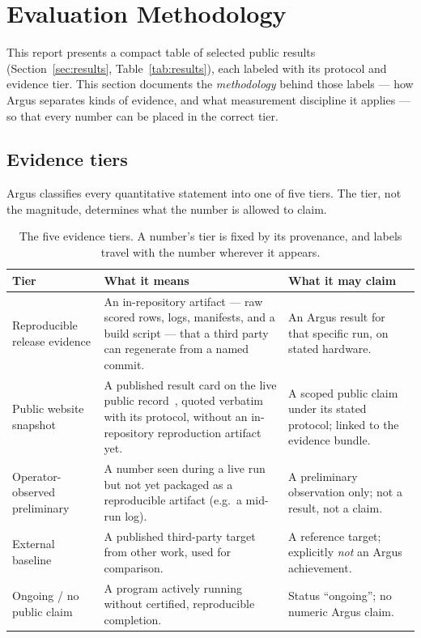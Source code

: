 \section{Evaluation Methodology}
\label{sec:evaluation}

This report presents a compact table of selected public results
(Section~\ref{sec:results}, Table~\ref{tab:results}), each labeled with its
protocol and evidence tier. This section documents the \emph{methodology} behind
those labels --- how Argus separates kinds of evidence, and what measurement
discipline it applies --- so that every number can be placed in the correct tier.

\subsection{Evidence tiers}

Argus classifies every quantitative statement into one of five tiers. The tier,
not the magnitude, determines what the number is allowed to claim.

\begin{table}[h]
\centering
\small
\renewcommand{\arraystretch}{1.35}
\begin{tabularx}{\linewidth}{@{}p{3.2cm} X p{3.0cm}@{}}
\toprule
\textbf{Tier} & \textbf{What it means} & \textbf{What it may claim} \\
\midrule
Reproducible release evidence &
An in-repository artifact --- raw scored rows, logs, manifests, and a build script ---
that a third party can regenerate from a named commit. &
An Argus result for that specific run, on stated hardware. \\
Public website snapshot &
A published result card on the live public record~\cite{argus_results}, quoted
verbatim with its protocol, without an in-repository reproduction artifact yet. &
A scoped public claim under its stated protocol; linked to the evidence bundle. \\
Operator-observed preliminary &
A number seen during a live run but not yet packaged as a reproducible artifact
(e.g.\ a mid-run log). &
A preliminary observation only; not a result, not a claim. \\
External baseline &
A published third-party target from other work, used for comparison. &
A reference target; explicitly \emph{not} an Argus achievement. \\
Ongoing / no public claim &
A program actively running without certified, reproducible completion. &
Status ``ongoing''; no numeric Argus claim. \\
\bottomrule
\end{tabularx}
\caption{The five evidence tiers. A number's tier is fixed by its provenance, and
labels travel with the number wherever it appears.}
\label{tab:tiers}
\end{table}

